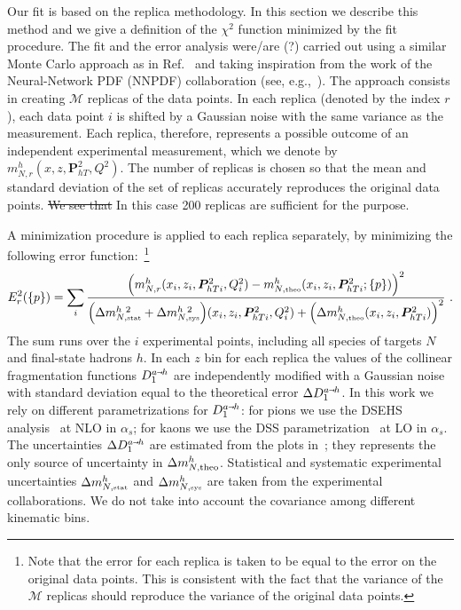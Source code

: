 \documentclass[aps,preprintnumbers,showpacs,nofootinbib,superscriptaddress,floatfix]{revtex4}
\newcommand{\AS}[1]{{\textcolor[rgb]{1,0,1}{#1}}}
\newcommand{\smarrow}{\mbox{\raisebox{-4.5pt}[0pt][0pt]{$\hspace{-1pt} 
		\vec{\phantom{v}}$}}}
\newcommand{\Tperp}{T}
\begin{document}
\AS{Our fit is based on the replica methodology.} In this section we describe \AS{this} method and we give a definition of the $\chi^2$ function minimized by the fit procedure.
The fit and the error analysis \AS{were/are (?)} carried out using a similar Monte Carlo approach as in Ref.~\cite{Bacchetta:2012ty,Signori:2013mda,Radici:2015mwa} and taking
inspiration from the work of the Neural-Network PDF (NNPDF) collaboration (see, e.g.,~\cite{Forte:2002fg,Ball:2008by,Ball:2010de}). 
The approach consists in creating $\mathcal{M}$ replicas of the data points. In each replica (denoted by the index $r$), each data point $i$ is shifted by a Gaussian noise with the same variance as the measurement. 
Each replica, therefore, represents a possible outcome of an independent experimental measurement, which we denote by $m_{N, r}^{h}(x, z, \bm{P}_{h\Tperp}^2, Q^2)$. 
The number of replicas is chosen so that the mean and standard deviation of the set of replicas accurately reproduces the original data points. \AS{\sout{We see that} In this case} 200 replicas are sufficient for the purpose.

A minimization procedure is applied to each replica separately, by minimizing the following error function:~\footnote{Note that the error for each replica is taken to be equal to the error on the original data points. This is consistent with the fact that the variance of the $\mathcal{M}$ replicas should reproduce the variance of the original data points.}  
\begin{equation}
E_r^2(\{p\})=\sum_{i} 
\frac{\Bigl(m_{N, r}^{h}(x_i, z_i, \bm{P}_{h\Tperp i}^2, Q_i^2) - m_{N,  \mbox{\tiny theo}}^{h}(x_i, z_i, \bm{P}_{h\Tperp i}^2; \{p\})\Bigr)^2}
        {\Bigl( \Delta m_{N, \mbox{\tiny stat}}^{h\ 2} + \Delta m_{N, \mbox{\tiny sys}}^{h\ 2} \Bigr)(x_i, z_i, \bm{P}_{h\Tperp i}^2, Q^2_i) +\Bigl(\Delta m_{N, \mbox{\tiny theo}}^{h}(x_i, z_i, \bm{P}_{h\Tperp i}^2) \Bigr)^2}\  . 
\label{e:MC_chi2}
\end{equation}
The sum runs over the $i$ experimental points, including all species of targets $N$ and final-state hadrons $h$. 
In each $z$ bin for each replica the values of the collinear fragmentation functions $D_1^{a \smarrow h}$ are independently modified with a Gaussian noise with standard deviation equal to the theoretical error $\Delta D_1^{a\smarrow h}$. 
In this work we rely on different parametrizations for $D_1^{a \smarrow h}$: for pions we use the DSEHS analysis~\cite{deFlorian:2014xna} at NLO in $\alpha_s$; for kaons we use the DSS parametrization~\cite{deFlorian:2007aj} at LO in $\alpha_s$. 
The uncertainties $\Delta D_1^{a\smarrow h}$ are estimated from the plots in~\cite{Epele:2012vg}; they represents the only source of uncertainty in $\Delta m_{N,  {\rm theo}}^{h}$. 
Statistical and systematic experimental uncertainties $\Delta m_{N, \mbox{\tiny stat}}^{h}$ and $\Delta m_{N, \mbox{\tiny sys}}^{h}$ are taken from the experimental collaborations. 
We do not take into account the covariance among different kinematic bins. 
\end{document}
